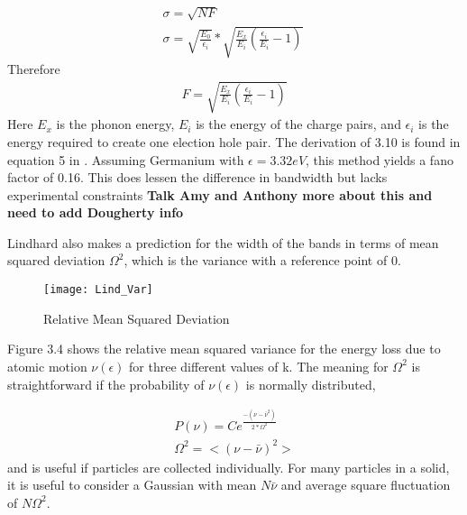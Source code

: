 \begin{equation}
\begin{gathered}
\sigma = \sqrt{NF}\\
\sigma =\sqrt{\frac{E_0}{\epsilon_i}}*\sqrt{\frac{E_x}{E_i}(\frac{\epsilon_i}{E_i}-1)}\
\end{gathered}
\end{equation} 
\noindent
Therefore 
\begin{equation}
\begin{gathered}
F = \sqrt{\frac{E_x}{E_i}(\frac{\epsilon_i}{E_i}-1)}
\end{gathered}
\end{equation} 
Here $E_x$ is the phonon energy, $E_i$ is the energy of the charge pairs, and $\epsilon_i$ is the energy required to create one election hole pair. The derivation of 3.10 is found in equation 5 in \cite{Mei}. Assuming Germanium with $\epsilon = 3.32 eV$, this method yields a fano factor of 0.16. This does lessen the difference in bandwidth but lacks experimental constraints \textbf{Talk Amy and Anthony more about this and need to add Dougherty info}\par
\noindent
Lindhard also makes a prediction for the width of the bands in terms of mean squared deviation $\Omega^2$, which is the variance with a reference point of 0.\cite{Lindhard_3}



\begin{figure}[h]
	\centering
	\texttt{[image: Lind\_Var]}
	\caption{Relative Mean Squared Deviation}
\end{figure}
\noindent
Figure 3.4 shows the relative mean squared variance for the energy loss due to atomic motion $\nu(\epsilon)$ for three different values of k. The meaning for $\Omega^2$ is straightforward if the probability of $\nu(\epsilon)$ is normally distributed, 

\begin{equation}
\begin{gathered}
P(\nu) = Ce^{\frac{-(\nu-\bar{\nu}^2)}{2*\Omega^2}}\\
\Omega^2 = <(\nu - \bar{\nu})^2>
\end{gathered}
\end{equation}
\noindent
and is useful if particles are collected individually. For many particles in a solid, it is useful to consider a Gaussian with mean $N\bar{\nu}$ and average square fluctuation of $N\Omega^2$.




